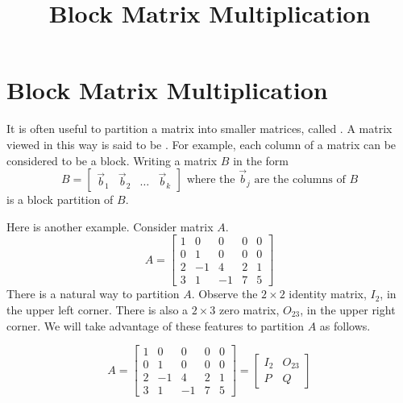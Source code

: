\documentclass{ximera}
\title{Block Matrix Multiplication} \license{CC BY-NC-SA 4.0}
\begin{document}
\begin{abstract}

\end{abstract}
\maketitle

\section*{Block Matrix Multiplication}

It is often useful to partition a matrix into smaller matrices, called . A matrix viewed in this way is said to be .  For example, each column of a matrix can be considered to be a block.  Writing a matrix $B$ in the form
\begin{equation*}
B = \begin{bmatrix}
\vec{b}_{1} & \vec{b}_{2} & \ldots & \vec{b}_{k}
\end{bmatrix} \mbox{ where the } \vec{b}_{j} \mbox{ are the columns of } B
\end{equation*}
is a block partition of $B$. 

Here is another example.  Consider matrix $A$.
\begin{equation*}
A = \left[ \begin{array}{rrrrr}
1 & 0 & 0 & 0 & 0 \\
0 & 1 & 0 & 0 & 0 \\
2 & -1 & 4 & 2 & 1 \\
3 & 1 & -1 & 7 & 5
\end{array} \right]
\end{equation*}
There is a natural way to partition $A$. Observe the $2\times 2$ identity matrix, $I_2$, in the upper left corner.  There is also a $2\times 3$ zero matrix, $O_{23}$, in the upper right corner.  We will take advantage of these features to partition $A$ as follows.

\begin{equation*}
A = \left[ \begin{array}{rr|rrr}
1 & 0 & 0 & 0 & 0 \\
0 & 1 & 0 & 0 & 0 \\
\hline
2 & -1 & 4 & 2 & 1 \\
3 & 1 & -1 & 7 & 5
\end{array} \right] = \left[ \begin{array}{cc}
I_{2} & O_{23} \\
P & Q
\end{array} \right]
\end{equation*}
\end{document}
